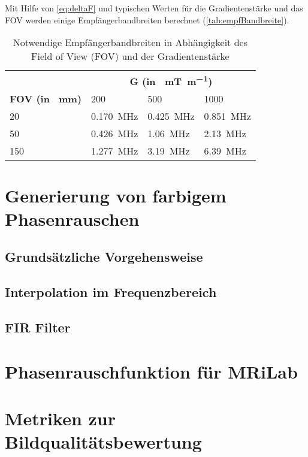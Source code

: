 Mit Hilfe von \autoref{eq:deltaF} und typischen Werten für die Gradientenstärke und das FOV werden einige Empfängerbandbreiten berechnet (\autoref{tab:empfBandbreite}).

\begin{table}[H]
	\centering
	\caption{Notwendige Empfängerbandbreiten in Abhängigkeit des Field of View (FOV) und der Gradientenstärke}
	\label{tab:empfBandbreite}
	\begin{tabular}{llll}
		\toprule
		& \multicolumn{3}{c}{\textbf{G (in \SI{}{\milli\tesla\per\meter})}} \\ \cmidrule{2-4}
		\textbf{FOV (in \SI{}{\mm})}& 200 & 500 & 1000 \\
		20 & \SI{0.170}{\mega\hertz} & \SI{0.425}{\mega\hertz} & \SI{0.851}{\mega\hertz} \\
		50 & \SI{0.426}{\mega\hertz} & \SI{1.06}{\mega\hertz} & \SI{2.13}{\mega\hertz} \\
		150 & \SI{1.277}{\mega\hertz} & \SI{3.19}{\mega\hertz} & \SI{6.39}{\mega\hertz} \\
		\bottomrule
	\end{tabular}
\end{table}

\section{Generierung von farbigem Phasenrauschen}

\subsection{Grundsätzliche Vorgehensweise}

\subsection{Interpolation im Frequenzbereich}

\subsection{FIR Filter}

\section{Phasenrauschfunktion für MRiLab}

\section{Metriken zur Bildqualitätsbewertung}
